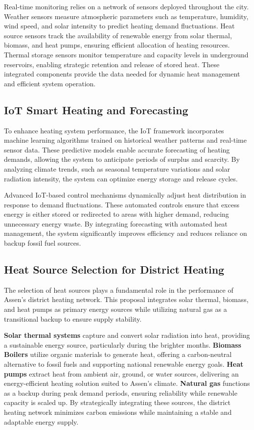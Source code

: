 \documentclass[conference]{IEEEtran}
\begin{document}
Real-time monitoring relies on a network of sensors deployed throughout the city. Weather sensors measure atmospheric parameters such as temperature, humidity, wind speed, and solar intensity to predict heating demand fluctuations. Heat source sensors track the availability of renewable energy from solar thermal, biomass, and heat pumps, ensuring efficient allocation of heating resources. Thermal storage sensors monitor temperature and capacity levels in underground reservoirs, enabling strategic retention and release of stored heat. These integrated components provide the data needed for dynamic heat management and efficient system operation.

\subsection{IoT Smart Heating and Forecasting}

To enhance heating system performance, the IoT framework incorporates machine learning algorithms trained on historical weather patterns and real-time sensor data. These predictive models enable accurate forecasting of heating demands, allowing the system to anticipate periods of surplus and scarcity. By analyzing climate trends, such as seasonal temperature variations and solar radiation intensity, the system can optimize energy storage and release cycles.

Advanced IoT-based control mechanisms dynamically adjust heat distribution in response to demand fluctuations. These automated controls ensure that excess energy is either stored or redirected to areas with higher demand, reducing unnecessary energy waste. By integrating forecasting with automated heat management, the system significantly improves efficiency and reduces reliance on backup fossil fuel sources.


\subsection{Heat Source Selection for District Heating}

The selection of heat sources plays a fundamental role in the performance of Assen’s district heating network. This proposal integrates solar thermal, biomass, and heat pumps as primary energy sources while utilizing natural gas as a transitional backup to ensure supply stability.

\textbf{Solar thermal systems} capture and convert solar radiation into heat, providing a sustainable energy source, particularly during the brighter months.
\textbf{Biomass Boilers} utilize organic materials to generate heat, offering a carbon-neutral alternative to fossil fuels and supporting national renewable energy goals.
\textbf{Heat pumps} extract heat from ambient air, ground, or water sources, delivering an energy-efficient heating solution suited to Assen’s climate.
\textbf{Natural gas} functions as a backup during peak demand periods, ensuring reliability while renewable capacity is scaled up.
By strategically integrating these sources, the district heating network minimizes carbon emissions while maintaining a stable and adaptable energy supply.
\end{document}
